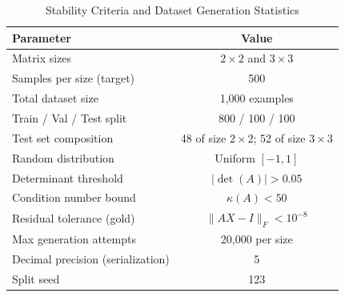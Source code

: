 \begin{table}[h!]
\centering
\caption{Stability Criteria and Dataset Generation Statistics}
\label{tab:stability}
\begin{tabular}{lc}
\toprule
\textbf{Parameter} & \textbf{Value} \\
\midrule
Matrix sizes & $2 \times 2$ and $3 \times 3$ \\
Samples per size (target) & 500 \\
Total dataset size & 1{,}000 examples \\
Train / Val / Test split & 800 / 100 / 100 \\
Test set composition & 48 of size $2 \times 2$; 52 of size $3 \times 3$ \\
Random distribution & Uniform $[-1, 1]$ \\
Determinant threshold & $|\det(A)| > 0.05$ \\
Condition number bound & $\kappa(A) < 50$ \\
Residual tolerance (gold) & $\|AX - I\|_F < 10^{-8}$ \\
Max generation attempts & 20{,}000 per size \\
Decimal precision (serialization) & 5 \\
Split seed & 123 \\
\bottomrule
\end{tabular}
\end{table}
